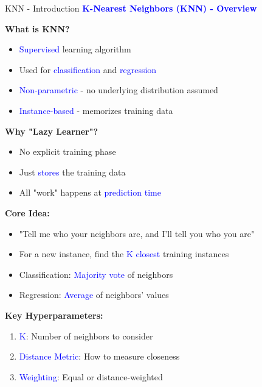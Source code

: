 \documentclass[8pt]{beamer}
\begin{document}
	\begin{frame}{KNN - Introduction}
		\fontsize{6.5}{7.5}\selectfont
		\textcolor{blue}{\textbf{K-Nearest Neighbors (KNN) - Overview}}
		
		\textbf{What is KNN?}
		\begin{itemize}
			\item \textcolor{blue}{Supervised} learning algorithm
			\item Used for \textcolor{blue}{classification} and \textcolor{blue}{regression}
			\item \textcolor{blue}{Non-parametric} - no underlying distribution assumed
			\item \textcolor{blue}{Instance-based} - memorizes training data
		\end{itemize}
		
		\textbf{Why "Lazy Learner"?}
		\begin{itemize}
			\item No explicit training phase
			\item Just \textcolor{blue}{stores} the training data
			\item All "work" happens at \textcolor{blue}{prediction time}
		\end{itemize}
		
		\textbf{Core Idea:}
		\begin{itemize}
			\item "Tell me who your neighbors are, and I'll tell you who you are"
			\item For a new instance, find the \textcolor{blue}{K closest} training instances
			\item Classification: \textcolor{blue}{Majority vote} of neighbors
			\item Regression: \textcolor{blue}{Average} of neighbors' values
		\end{itemize}
		
		\textbf{Key Hyperparameters:}
		\begin{enumerate}
			\item \textcolor{blue}{K}: Number of neighbors to consider
			\item \textcolor{blue}{Distance Metric}: How to measure closeness
			\item \textcolor{blue}{Weighting}: Equal or distance-weighted
		\end{enumerate}
	\end{frame}
	
\end{document}
